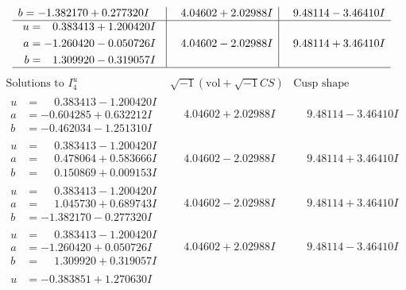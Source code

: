 \documentclass[1p]{elsarticle_modified}
\theoremstyle{definition}
\newcommand{\I}{\sqrt{-1}}
\begin{document}
$$\begin{array}{c|c|c}
\begin{aligned}
b &= -1.382170 + 0.277320 I\end{aligned}
 & \phantom{-}4.04602 + 2.02988 I & \phantom{-}9.48114 - 3.46410 I \\ \hline\begin{aligned}
u &= \phantom{-}0.383413 + 1.200420 I \\
a &= -1.260420 - 0.050726 I \\
b &= \phantom{-}1.309920 - 0.319057 I\end{aligned}
 & \phantom{-}4.04602 - 2.02988 I & \phantom{-}9.48114 + 3.46410 I\\
 \hline 
 \end{array}$$\newpage$$\begin{array}{c|c|c}  
\text{Solutions to }I^u_{4}& \I (\text{vol} + \sqrt{-1}CS) & \text{Cusp shape}\\
 \hline 
\begin{aligned}
u &= \phantom{-}0.383413 - 1.200420 I \\
a &= -0.604285 + 0.632212 I \\
b &= -0.462034 - 1.251310 I\end{aligned}
 & \phantom{-}4.04602 + 2.02988 I & \phantom{-}9.48114 - 3.46410 I \\ \hline\begin{aligned}
u &= \phantom{-}0.383413 - 1.200420 I \\
a &= \phantom{-}0.478064 + 0.583666 I \\
b &= \phantom{-}0.150869 + 0.009153 I\end{aligned}
 & \phantom{-}4.04602 - 2.02988 I & \phantom{-}9.48114 + 3.46410 I \\ \hline\begin{aligned}
u &= \phantom{-}0.383413 - 1.200420 I \\
a &= \phantom{-}1.045730 + 0.689743 I \\
b &= -1.382170 - 0.277320 I\end{aligned}
 & \phantom{-}4.04602 - 2.02988 I & \phantom{-}9.48114 + 3.46410 I \\ \hline\begin{aligned}
u &= \phantom{-}0.383413 - 1.200420 I \\
a &= -1.260420 + 0.050726 I \\
b &= \phantom{-}1.309920 + 0.319057 I\end{aligned}
 & \phantom{-}4.04602 + 2.02988 I & \phantom{-}9.48114 - 3.46410 I \\ \hline\begin{aligned}
u &= -0.383851 + 1.270630 I \\

\end{aligned}
\end{array}$$
\end{document}
